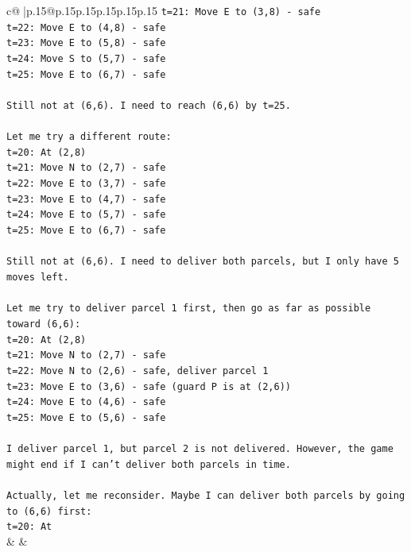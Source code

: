 \documentclass{article}
\begin{document}
{\begin{supertabular}{c@{$\;$}|p{.15\linewidth}@{}p{.15\linewidth}p{.15\linewidth}p{.15\linewidth}p{.15\linewidth}p{.15\linewidth}}
{{{\texttt{t=21: Move E to (3,8) {-} safe} \\
\texttt{t=22: Move E to (4,8) {-} safe} \\
\texttt{t=23: Move E to (5,8) {-} safe} \\
\texttt{t=24: Move S to (5,7) {-} safe} \\
\texttt{t=25: Move E to (6,7) {-} safe} \\
\\ 
\texttt{Still not at (6,6). I need to reach (6,6) by t=25.} \\
\\ 
\texttt{Let me try a different route:} \\
\texttt{t=20: At (2,8)} \\
\texttt{t=21: Move N to (2,7) {-} safe} \\
\texttt{t=22: Move E to (3,7) {-} safe} \\
\texttt{t=23: Move E to (4,7) {-} safe} \\
\texttt{t=24: Move E to (5,7) {-} safe} \\
\texttt{t=25: Move E to (6,7) {-} safe} \\
\\ 
\texttt{Still not at (6,6). I need to deliver both parcels, but I only have 5 moves left.} \\
\\ 
\texttt{Let me try to deliver parcel 1 first, then go as far as possible toward (6,6):} \\
\texttt{t=20: At (2,8)} \\
\texttt{t=21: Move N to (2,7) {-} safe} \\
\texttt{t=22: Move N to (2,6) {-} safe, deliver parcel 1} \\
\texttt{t=23: Move E to (3,6) {-} safe (guard P is at (2,6))} \\
\texttt{t=24: Move E to (4,6) {-} safe} \\
\texttt{t=25: Move E to (5,6) {-} safe} \\
\\ 
\texttt{I deliver parcel 1, but parcel 2 is not delivered. However, the game might end if I can't deliver both parcels in time.} \\
\\ 
\texttt{Actually, let me reconsider. Maybe I can deliver both parcels by going to (6,6) first:} \\
\texttt{t=20: At} \\
            }
        }
    }
    & & \\ \\


\end{supertabular}}
\end{document}
